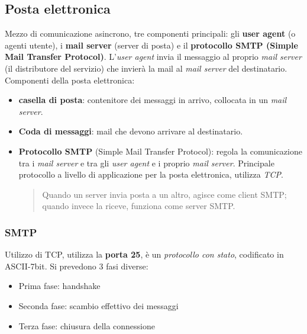 \subsection{Posta elettronica}
Mezzo di comunicazione asincrono, tre componenti principali: gli \textbf{user agent} (o agenti utente), i \textbf{mail server} (server di posta) e il \textbf{protocollo SMTP (Simple Mail Transfer Protocol)}. 
L'\textit{user agent} invia il messaggio al proprio \textit{mail server} (il distributore del servizio) che invierà la mail al \textit{mail server} del destinatario.
Componenti della posta elettronica:
\begin{itemize}
  \item \textbf{casella di posta}: contenitore dei messaggi in arrivo, collocata in un \textit{mail server}.
  \item \textbf{Coda di messaggi}: mail che devono arrivare al destinatario.
  \item \textbf{Protocollo SMTP} (Simple Mail Transfer Protocol): regola la comunicazione tra i \textit{mail server} e tra gli \textit{user agent} e i proprio \textit{mail server}. Principale protocollo a livello di applicazione per la posta elettronica, utilizza \textit{TCP}.
  \begin{quote}
    Quando un server invia posta a un altro, agisce come client SMTP; quando invece la riceve, funziona come server SMTP.
  \end{quote}
\end{itemize}

\subsubsection{SMTP}
Utilizzo di TCP, utilizza la \textbf{porta 25}, è un \textit{protocollo con stato}, codificato in ASCII-7bit. \newline
Si prevedono 3 fasi diverse:
\begin{itemize}
  \item Prima fase: handshake
  \item Seconda fase: scambio effettivo dei messaggi
  \item Terza fase: chiusura della connessione 
\end{itemize}

